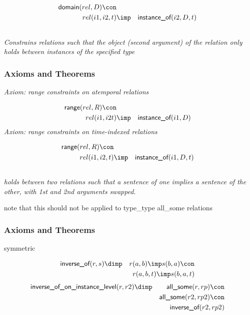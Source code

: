 \begin{eqnarray*}
 \pr{domain}(rel, D) \con \\
rel(i1, i2, t) &\imp & \pr{instance\_of}(i2, D, t) 
\end{eqnarray*}

\subsection{ }
\emph{Constrains relations such that the object (second argument) of the relation only holds between instances of the specified type}

\subsubsection{Axioms and Theorems}


\emph{Axiom: range constraints on atemporal relations}

\begin{eqnarray*}
 \pr{range}(rel, R) \con \\
rel(i1, i2t) &\imp & \pr{instance\_of}(i1, D) 
\end{eqnarray*}
\emph{Axiom: range constraints on time-indexed relations}

\begin{eqnarray*}
 \pr{range}(rel, R) \con \\
rel(i1, i2, t) &\imp & \pr{instance\_of}(i1, D, t) 
\end{eqnarray*}

\subsection{ }
\emph{holds between two relations such that a sentence of one implies a sentence of the other, with 1st and 2nd arguments swapped.}

note that this should not be applied to type\_type all\_some relations

\subsubsection{Axioms and Theorems}

\begin{clist}
\item symmetric
\end{clist}

\begin{eqnarray*}
 \pr{inverse\_of}(r, s) &\dimp &r(a, b) \imp s(b, a) \con \\
&&r(a, b, t) \imp s(b, a, t) 
\end{eqnarray*}
\begin{eqnarray*}
 \pr{inverse\_of\_on\_instance\_level}(r, r2) &\dimp & \pr{all\_some}(r, rp) \con \\
&& \pr{all\_some}(r2, rp2) \con \\
&& \pr{inverse\_of}(r2, rp2) 
\end{eqnarray*}

